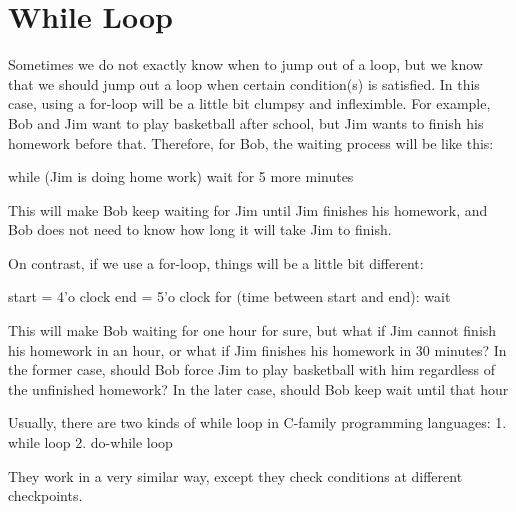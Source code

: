 \documentclass[../main.tex]{subfiles}
\begin{document}
    \section{While Loop}
Sometimes we do not exactly know when to jump out of a loop, but we know that we
should jump out a loop when certain condition(s) is satisfied.  In this case,
using a for-loop will be a little bit clumpsy and infleximble. For example, Bob
and Jim want to play basketball after school, but Jim wants to finish his
homework before that. Therefore, for Bob, the waiting process will be like this:

while (Jim is doing home work)
    wait for 5 more minutes

This will make Bob keep waiting for Jim until Jim finishes his homework, and Bob
does not need to know how long it will take Jim to finish.

On contrast, if we use a for-loop, things will be a little bit different:

start = 4'o clock
end = 5'o clock
for (time between start and end):
    wait

This will make Bob waiting for one hour for sure, but what if Jim cannot finish
his homework in an hour, or what if Jim finishes his homework in 30 minutes? In
the former case, should Bob force Jim to play basketball with him regardless of
the unfinished homework? In the later case, should Bob keep wait until that hour

Usually, there are two kinds of while loop in C-family programming languages:
1. while loop
2. do-while loop

They work in a very similar way, except they check conditions at different checkpoints.
\end{document}
